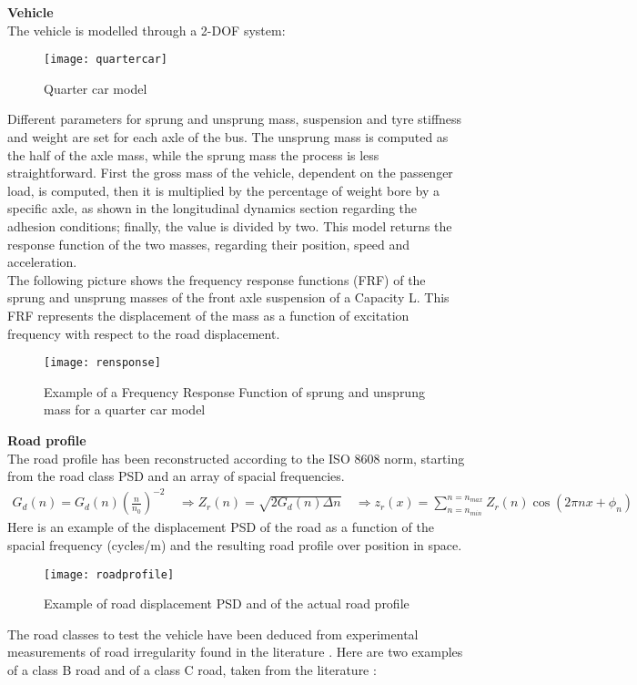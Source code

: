 \documentclass{article}
\begin{document}
\textbf{Vehicle}\\
The vehicle is modelled through a 2-DOF system: 
\begin{figure}[H]
\centering
\texttt{[image: quartercar]}
\caption{Quarter car model}
\end{figure}
Different parameters for sprung and unsprung mass, suspension and tyre stiffness and weight are set for each axle of the bus. The unsprung mass is computed as the half of the axle mass, while the sprung mass the process is less straightforward. First the gross mass of the vehicle, dependent on the passenger load, is computed, then it is multiplied by the percentage of weight bore by a specific axle, as shown in the longitudinal dynamics section regarding the adhesion conditions; finally, the value is divided by two. This model returns the response function of the two masses, regarding their position, speed and acceleration.\\
The following picture shows the frequency response functions (FRF) of the sprung and unsprung masses of the front axle suspension of a Capacity L. This FRF represents the displacement of the mass as a function of excitation frequency with respect to the road displacement. 
\begin{figure}[H]
\centering
\texttt{[image: rensponse]}
\caption{Example of a Frequency Response Function of sprung and unsprung mass for a quarter car model}
\end{figure} 
\textbf{Road profile}\\
The road profile has been reconstructed according to the ISO 8608 norm, starting from the road class PSD and an array of spacial frequencies.\\
\begin{align*}
G_d(n)=G_d(n)(\frac{n}{n_0})^{-2}\:&\Longrightarrow  Z_{r}(n)=\sqrt{2G_{d}(n)\Delta n}\:&\Longrightarrow 
z_{r}(x)=\sum_{n=n_{min}}^{n=n_{max}}Z_{r}(n)\cos(2\pi nx+\phi_{n})
\end{align*}
Here is an example of the displacement PSD of the road as a function of the spacial frequency (cycles/m) and the resulting road profile over position in space. 
\begin{figure}[H]
\centering
\texttt{[image: roadprofile]}
\caption{Example of road displacement PSD and of the actual road profile }
\end{figure} 
The road classes to test the vehicle have been deduced from experimental measurements of road irregularity found in the literature \cite{irregularity1}. Here are two examples of a class B road and of a class C road, taken from the literature \cite{irregularity2}: 
\end{document}
